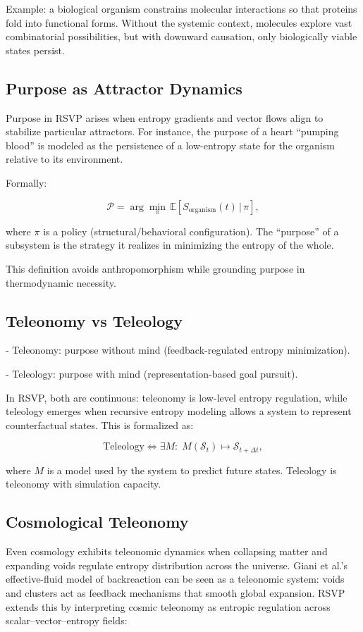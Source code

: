 \documentclass[12pt]{book}
\begin{document}
Example: a biological organism constrains molecular interactions so that proteins fold into functional forms. Without the systemic context, molecules explore vast combinatorial possibilities, but with downward causation, only biologically viable states persist.

\subsection{Purpose as Attractor Dynamics}
Purpose in RSVP arises when entropy gradients and vector flows align to stabilize particular attractors. For instance, the purpose of a heart “pumping blood” is modeled as the persistence of a low-entropy state for the organism relative to its environment.

Formally:

\[ \mathcal{P} = \arg\min_{\pi} \, \mathbb{E}[S_{\text{organism}}(t) \, | \, \pi], \]

where \( \pi \) is a policy (structural/behavioral configuration). The “purpose” of a subsystem is the strategy it realizes in minimizing the entropy of the whole.

This definition avoids anthropomorphism while grounding purpose in thermodynamic necessity.

\subsection{Teleonomy vs Teleology}
- Teleonomy: purpose without mind (feedback-regulated entropy minimization).

- Teleology: purpose with mind (representation-based goal pursuit).

In RSVP, both are continuous: teleonomy is low-level entropy regulation, while teleology emerges when recursive entropy modeling allows a system to represent counterfactual states. This is formalized as:

\[ \text{Teleology} \iff \exists M : \; M(\mathcal{S}_t) \mapsto \mathcal{S}_{t+\Delta t}, \]

where \( M \) is a model used by the system to predict future states. Teleology is teleonomy with simulation capacity.

\subsection{Cosmological Teleonomy}
Even cosmology exhibits teleonomic dynamics when collapsing matter and expanding voids regulate entropy distribution across the universe. Giani et al.’s effective-fluid model of backreaction can be seen as a teleonomic system: voids and clusters act as feedback mechanisms that smooth global expansion. RSVP extends this by interpreting cosmic teleonomy as entropic regulation across scalar–vector–entropy fields:
\end{document}

